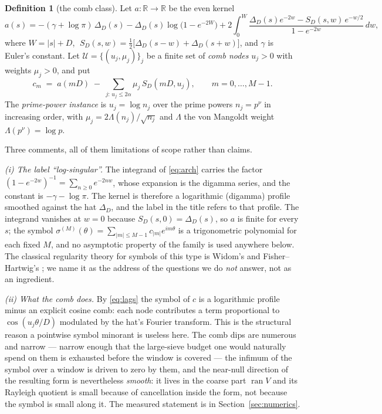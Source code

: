 \documentclass[11pt,a4paper]{article}
\theoremstyle{plain}
\theoremstyle{definition}
\newtheorem{definition}[theorem]{Definition}
\newcommand{\R}{\mathbb{R}}
\newcommand{\ran}{\operatorname{ran}}
\begin{document}
\begin{definition}[the comb class]
\label{def:class}
Let $a:\R\to\R$ be the even kernel
\begin{equation}
\label{eq:arch}
  a(s)=-(\gamma+\log\pi)\,\Delta_{D}(s)
      -\Delta_{D}(s)\log\!\bigl(1-e^{-2W}\bigr)
      +2\int_{0}^{W}
        \frac{\Delta_{D}(s)e^{-2w}-S_{D}(s,w)\,e^{-w/2}}{1-e^{-2w}}\,dw,
\end{equation}
where $W=|s|+D$, $\;S_{D}(s,w)=\tfrac12\bigl[\Delta_{D}(s-w)+\Delta_{D}(s+w)\bigr]$,
and $\gamma$ is Euler's constant. Let $\mathcal U=\{(u_{j},\mu_{j})\}_{j}$ be a
finite set of \emph{comb nodes} $u_{j}>0$ with weights $\mu_{j}>0$, and put
\begin{equation}
\label{eq:lags}
  c_{m} \;=\; a(mD)\;-\;\sum_{j:\,u_{j}\le 2\alpha}\mu_{j}\,S_{D}(mD,u_{j}),
  \qquad m=0,\dots,M-1 .
\end{equation}
The \emph{prime-power instance} is $u_{j}=\log n_{j}$ over the prime powers
$n_{j}=p^{\nu}$ in increasing order, with $\mu_{j}=2\Lambda(n_{j})/\sqrt{n_{j}}$ and
$\Lambda$ the von Mangoldt weight $\Lambda(p^{\nu})=\log p$.
\end{definition}

Three comments, all of them limitations of scope rather than claims.

\emph{(i) The label ``log-singular''.} The integrand of \eqref{eq:arch} carries the
factor $(1-e^{-2w})^{-1}=\sum_{n\ge0}e^{-2nw}$, whose expansion is the digamma
series, and the constant is $-\gamma-\log\pi$. The kernel is therefore a
logarithmic (digamma) profile smoothed against the hat $\Delta_{D}$, and the label
in the title refers to that profile. The integrand vanishes at $w=0$ because
$S_{D}(s,0)=\Delta_{D}(s)$, so $a$ is finite for every $s$; the symbol
$\sigma^{(M)}(\theta)=\sum_{|m|\le M-1}c_{|m|}e^{im\theta}$ is a trigonometric
polynomial for each fixed $M$, and no asymptotic property of the family is used
anywhere below. The classical regularity theory for symbols of this type is Widom's
and Fisher--Hartwig's \cite{Widom1974,FisherHartwig1969,BoettcherSilbermann2006}; we
name it as the address of the questions we do \emph{not} answer, not as an ingredient.

\emph{(ii) What the comb does.} By \eqref{eq:lags} the symbol of $c$ is a logarithmic
profile minus an explicit cosine comb: each node contributes a term proportional to
$\cos(u_{j}\theta/D)$ modulated by the hat's Fourier transform. This is the structural
reason a pointwise symbol minorant is useless here. The comb dips are numerous and
narrow --- narrow enough that the large-sieve budget one would naturally spend on them
\cite{MontgomeryVaughan1974} is exhausted before the window is covered --- the
infimum of the symbol over a window is driven to zero by them, and the
near-null direction of the resulting form is nevertheless \emph{smooth}: it lives in
the coarse part $\ran V$ and its Rayleigh quotient is small because of cancellation
inside the form, not because the symbol is small along it. The measured statement is
in Section~\ref{sec:numerics}.
\end{document}
